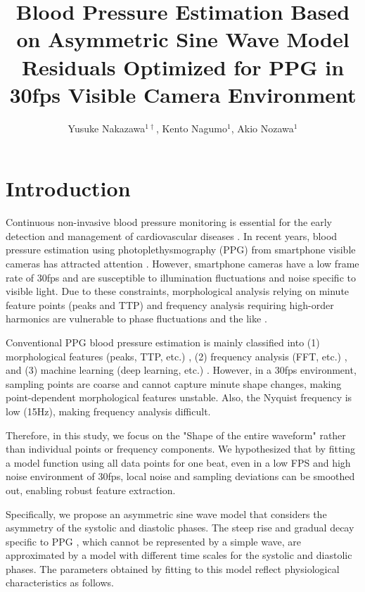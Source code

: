 \documentclass[fleqn,10pt,twocolumn]{AROB}
\title{Blood Pressure Estimation Based on Asymmetric Sine Wave Model Residuals Optimized for PPG in 30fps Visible Camera Environment}
\author{Yusuke Nakazawa${}^{1\dagger}$, Kento Nagumo${}^{1}$, Akio Nozawa${}^{1}$}
\begin{document}
\maketitle


\section{Introduction}

Continuous non-invasive blood pressure monitoring is essential for the early detection and management of cardiovascular diseases \cite{ref1,ref2}. In recent years, blood pressure estimation using photoplethysmography (PPG) from smartphone visible cameras has attracted attention \cite{ref3}. However, smartphone cameras have a low frame rate of 30fps and are susceptible to illumination fluctuations and noise specific to visible light. Due to these constraints, morphological analysis relying on minute feature points (peaks and TTP) and frequency analysis requiring high-order harmonics are vulnerable to phase fluctuations and the like \cite{ref4,ref5}.

Conventional PPG blood pressure estimation is mainly classified into (1) morphological features (peaks, TTP, etc.) \cite{ref6}, (2) frequency analysis (FFT, etc.) \cite{ref7}, and (3) machine learning (deep learning, etc.) \cite{ref8}. However, in a 30fps environment, sampling points are coarse and cannot capture minute shape changes, making point-dependent morphological features unstable. Also, the Nyquist frequency is low (15Hz), making frequency analysis difficult.

Therefore, in this study, we focus on the "Shape of the entire waveform" rather than individual points or frequency components. We hypothesized that by fitting a model function using all data points for one beat, even in a low FPS and high noise environment of 30fps, local noise and sampling deviations can be smoothed out, enabling robust feature extraction.

Specifically, we propose an asymmetric sine wave model that considers the asymmetry of the systolic and diastolic phases. The steep rise and gradual decay specific to PPG \cite{ref11}, which cannot be represented by a simple  wave, are approximated by a model with different time scales for the systolic and diastolic phases. The parameters obtained by fitting to this model reflect physiological characteristics as follows.
\end{document}
